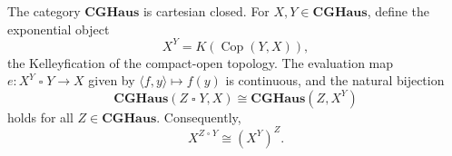 The category $\mathbf{CGHaus}$ is cartesian closed. For $X, Y \in \mathbf{CGHaus}$, define the exponential object
$$X^Y = K(\operatorname{Cop}(Y, X)),$$
the Kelleyfication of the compact-open topology. The evaluation map $e: X^Y \mathbin{\square} Y \to X$ given by $\langle f, y \rangle \mapsto f(y)$ is continuous, and the natural bijection
$$\mathbf{CGHaus}(Z \mathbin{\square} Y, X) \cong \mathbf{CGHaus}(Z, X^Y)$$
holds for all $Z \in \mathbf{CGHaus}$. Consequently,
$$X^{Z \mathbin{\square} Y} \cong (X^Y)^Z.$$
